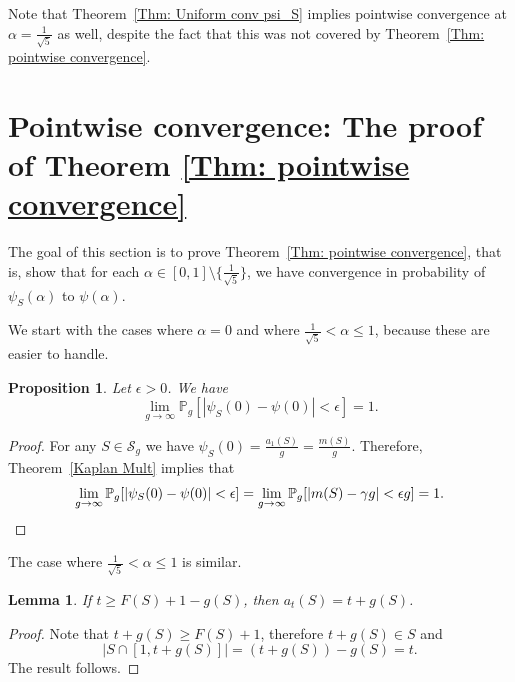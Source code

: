 \documentclass[12pt]{amsart}
\renewcommand{\P}{\mathbb{P}}
\def\SS{{\mathcal S}}
\newtheorem{lemma}[theorem]{Lemma}
\newtheorem{proposition}[theorem]{Proposition}
\begin{document}
Note that Theorem~\ref{Thm: Uniform conv psi_S} implies pointwise convergence at $\alpha=\frac{1}{\sqrt{5}}$ as well, despite the fact that this was not covered by Theorem~\ref{Thm: pointwise convergence}.











\section{Pointwise convergence: The proof of Theorem \ref{Thm: pointwise convergence}}\label{Sec: pointwise}

The goal of this section is to prove Theorem~\ref{Thm: pointwise convergence}, that is, show that for each $\alpha\in [0,1]\setminus\{\frac{1}{\sqrt{5}}\}$, we have convergence in probability of $\psi_S(\alpha)$ to $\psi(\alpha)$.

We start with the cases where $\alpha=0$ and where $\frac{1}{\sqrt{5}}<\alpha\leq 1$, because these are easier to handle.

\begin{proposition}\label{Prop: pointwise alpha 0}
Let $\epsilon>0$.  We have
\[
\lim_{g\to\infty} \P_g[ |\psi_S(0) -\psi(0)|<\epsilon ] =1.
\]
\end{proposition}
\begin{proof}
For any $S \in \SS_g$ we have $\psi_S(0) = \frac{a_{1}(S)}{g} = \frac{m(S)}{g}$.  Therefore, Theorem~\ref{Kaplan Mult} implies that
\[
\lim_{g\to\infty} \P_g[ |\psi_S(0) -\psi(0)|<\epsilon ]
=\lim_{g\to\infty} \P_g[ |m(S) -\gamma g|<\epsilon g ]=1. \qedhere
\]
\end{proof}

The case where $\frac{1}{\sqrt{5}}<\alpha\leq 1$ is similar.
\begin{lemma}\label{Lem: t>F+1-g}
If $t\geq F(S)+1-g(S)$, then $a_t(S)=t+g(S)$.    
\end{lemma}
\begin{proof}
Note that $t+g(S)\geq F(S)+1$, therefore $t+g(S)\in S$ and
\[|S\cap [1,t+g(S)]| =(t+g(S))- g(S)=t.\]
The result follows.
\end{proof}
\end{document}
